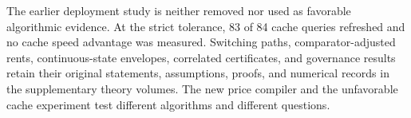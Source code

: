 The earlier deployment study is neither removed nor used as favorable algorithmic evidence. At the strict tolerance, 83 of 84 cache queries refreshed and no cache speed advantage was measured. Switching paths, comparator-adjusted rents, continuous-state envelopes, correlated certificates, and governance results retain their original statements, assumptions, proofs, and numerical records in the supplementary theory volumes. The new price compiler and the unfavorable cache experiment test different algorithms and different questions.

